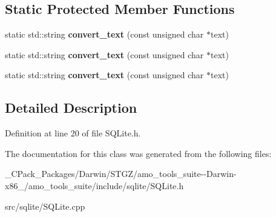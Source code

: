 \subsection*{Static Protected Member Functions}
\begin{DoxyCompactItemize}
\item 
\mbox{\label{class_s_q_lite_wrapper_a46a46fe7c7b6887967540721368acd7c}} 
static std\+::string {\bfseries convert\+\_\+text} (const unsigned char $\ast$text)
\item 
\mbox{\label{class_s_q_lite_wrapper_a824d35be82b4e7771ad056886e4c88d5}} 
static std\+::string {\bfseries convert\+\_\+text} (const unsigned char $\ast$text)
\item 
\mbox{\label{class_s_q_lite_wrapper_a824d35be82b4e7771ad056886e4c88d5}} 
static std\+::string {\bfseries convert\+\_\+text} (const unsigned char $\ast$text)
\end{DoxyCompactItemize}


\subsection{Detailed Description}


Definition at line 20 of file S\+Q\+Lite.\+h.



The documentation for this class was generated from the following files\+:\begin{DoxyCompactItemize}
\item 
\+\_\+\+C\+Pack\+\_\+\+Packages/\+Darwin/\+S\+T\+G\+Z/amo\+\_\+tools\+\_\+suite-\/-\/\+Darwin-\/x86\+\_/amo\+\_\+tools\+\_\+suite/include/sqlite/S\+Q\+Lite.\+h\item 
src/sqlite/S\+Q\+Lite.\+cpp\end{DoxyCompactItemize}

